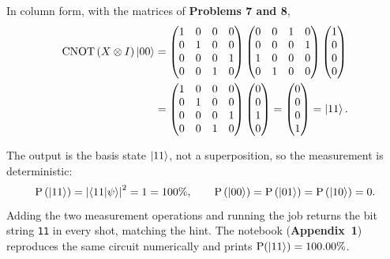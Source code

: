 \documentclass[a4paper, 10pt]{article}
\begin{document}
\begin{solution}
	\noindent In column form, with the matrices of \textbf{Problems 7 and 8},
	\begin{align*}
		\mathrm{CNOT}\left(X \otimes I\right)\ket{00}
		 & = \begin{pmatrix}
			     1 & 0 & 0 & 0 \\ 0 & 1 & 0 & 0 \\ 0 & 0 & 0 & 1 \\ 0 & 0 & 1 & 0
		     \end{pmatrix}
		\begin{pmatrix}
			0 & 0 & 1 & 0 \\ 0 & 0 & 0 & 1 \\ 1 & 0 & 0 & 0 \\ 0 & 1 & 0 & 0
		\end{pmatrix}
		\begin{pmatrix} 1 \\ 0 \\ 0 \\ 0 \end{pmatrix}                       \\
		 & = \begin{pmatrix}
			     1 & 0 & 0 & 0 \\ 0 & 1 & 0 & 0 \\ 0 & 0 & 0 & 1 \\ 0 & 0 & 1 & 0
		     \end{pmatrix}
		\begin{pmatrix} 0 \\ 0 \\ 1 \\ 0 \end{pmatrix}
		= \begin{pmatrix} 0 \\ 0 \\ 0 \\ 1 \end{pmatrix}
		= \ket{11} .
	\end{align*}

	\noindent The output is the basis state \( \ket{11} \), not a superposition, so the measurement is deterministic:
	\[
		\mathrm{P}\left(\ket{11}\right) = \left|\braket{11 \vert \psi}\right|^2 = 1 = 100\%,
		\qquad
		\mathrm{P}\left(\ket{00}\right) = \mathrm{P}\left(\ket{01}\right) = \mathrm{P}\left(\ket{10}\right) = 0 .
	\]
	Adding the two measurement operations and running the job returns the bit string \texttt{11} in every shot, matching the hint.
	The notebook (\textbf{Appendix~1}) reproduces the same circuit numerically and prints \( \mathrm{P}(\ket{11}) = 100.00\% \).


\end{solution}
\end{document}
